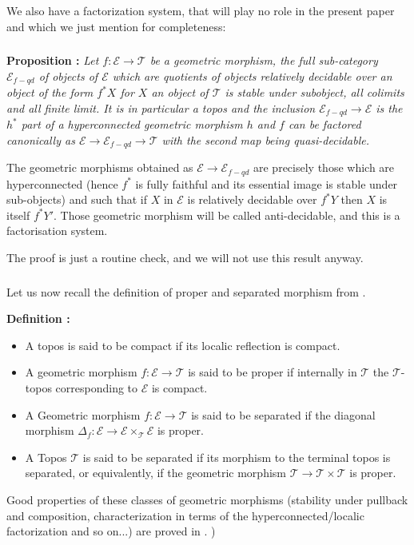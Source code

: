 \documentclass[a4paper]{article}
\newcommand{\Ecal}{\mathcal{E}}
\newcommand{\Tcal}{\mathcal{T}}
\newcommand{\block}[1]
{

\par \subsubsection{} #1

\bigskip}
\newcommand{\blockn}[1]{\par #1 \bigskip}
\newcommand{\Prop}[1]
	{

	\bigskip
	
	\textbf{Proposition : }{\itshape #1}
		
	\bigskip
	
	}
\newcommand{\Def}[1]
	{
	
	\bigskip
	
	\textbf{Definition : }{\itshape #1}
	
	\bigskip
	
	}
\begin{document}
\blockn{We also have a factorization system, that will play no role in the present paper and which we just mention for completeness:}

\block{\Prop{Let $f :\Ecal \rightarrow \Tcal$ be a geometric morphism, the full sub-category $\Ecal_{f-qd}$ of objects of $\Ecal$ which are quotients of objects relatively decidable over an object of the form $f^*X$ for $X$ an object of $\Tcal$ is stable under subobject, all colimits and all finite limit. It is in particular a topos and the inclusion $\Ecal_{f-qd} \rightarrow \Ecal$ is the $h^*$ part of a hyperconnected geometric morphism $h$ and $f$ can be factored canonically as $\Ecal \rightarrow \Ecal_{f-qd} \rightarrow \Tcal$ with the second map being quasi-decidable.}

The geometric morphisms obtained as $\Ecal \rightarrow \Ecal_{f-qd}$ are precisely those which are hyperconnected (hence $f^*$ is fully faithful and its essential image is stable under sub-objects) and such that if $X$ in $\Ecal$ is relatively decidable over $f^*Y$ then $X$ is itself $f^* Y'$. Those geometric morphism will be called anti-decidable, and this is a factorisation system.

The proof is just a routine check, and we will not use this result anyway.

}

\block{Let us now recall the definition of proper and separated morphism from \cite{moerdijk2000proper}.

\Def{\begin{itemize}
\item A topos is said to be compact if its localic reflection is compact.
\item A geometric morphism $f :\Ecal \rightarrow \Tcal$ is said to be proper if internally in $\Tcal$ the $\Tcal$-topos corresponding to $\Ecal$ is compact.
\item A Geometric morphism $f : \Ecal \rightarrow \Tcal$ is said to be separated if the diagonal morphism $\Delta_f : \Ecal \rightarrow \Ecal \times_{\Tcal} \Ecal$ is proper.
\item A Topos $\Tcal$ is said to be separated if its morphism to the terminal topos is separated, or equivalently, if the geometric morphism $\Tcal \rightarrow \Tcal \times \Tcal$ is proper.
\end{itemize}
}

Good properties of these classes of geometric morphisms (stability under pullback and composition, characterization in terms of the hyperconnected/localic factorization and so on...) are proved in \cite{moerdijk2000proper}. )

}
\end{document}
